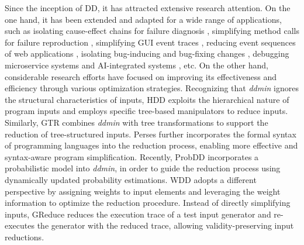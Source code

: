 Since the inception of DD, it has attracted extensive research attention.
On the one hand, it has been extended and adapted for a wide range of applications, such as isolating cause-effect chains for failure diagnosis \cite{Zeller2002b}, simplifying method calls for failure reproduction \cite{Burger2011}, simplifying GUI event traces \cite{Clapp2016}, reducing event sequences of web applications \cite{Hammoudi2015}, isolating bug-inducing and bug-fixing changes \cite{song2024c2d2}, debugging microservice systems \cite{Zhou2018} and AI-integrated systems \cite{zhu2026}, etc. 
On the other hand, considerable research efforts have focused on improving its effectiveness and efficiency through various optimization strategies.
Recognizing that \emph{ddmin} ignores the structural characteristics of inputs, HDD \cite{Misherghi2016} exploits the hierarchical nature of program inputs and employs specific tree-based manipulators to reduce inputs. 
Similarly, GTR \cite{Herfert2017} combines \emph{ddmin} with tree transformations to support the reduction of tree-structured inputs. 
Perses \cite{Sun2018} further incorporates the formal syntax of programming languages into the reduction process, enabling more effective and syntax-aware program simplification.
Recently, ProbDD \cite{wang2021} incorporates a probabilistic model into \emph{ddmin}, in order to guide the reduction process using dynamically updated probability estimations.
WDD \cite{zhou2025wdd} adopts a different perspective by assigning weights to input elements and leveraging the weight information to optimize the reduction procedure. 
Instead of directly simplifying inputs, GReduce \cite{ren2025} reduces the execution trace of a test input generator and re-executes the generator with the reduced trace, allowing validity-preserving input reductions.



